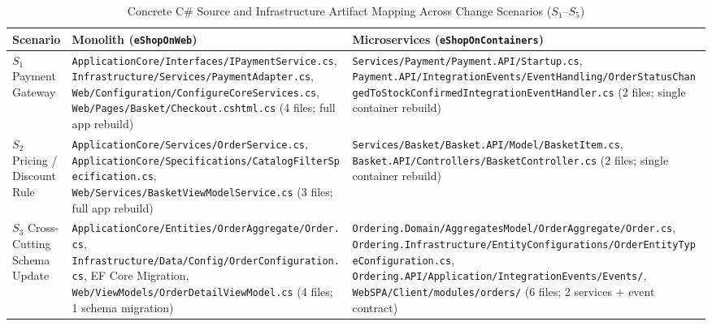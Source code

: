 \begin{table}[htbp]
\centering
\caption{Concrete C\# Source and Infrastructure Artifact Mapping Across Change Scenarios ($S_1$--$S_5$)}
\label{tab:csharp_artifact_map}
\footnotesize
\setlength{\tabcolsep}{4pt}
\renewcommand{\arraystretch}{1.25}
\begin{tabularx}{\linewidth}{>{\raggedright\arraybackslash}p{1.85cm} >{\raggedright\arraybackslash}X >{\raggedright\arraybackslash}X}
\toprule
\textbf{Scenario} & \textbf{Monolith (\texttt{eShopOnWeb})} & \textbf{Microservices (\texttt{eShopOnContainers})} \\
\midrule
$S_1$ Payment Gateway &
\texttt{ApplicationCore/\allowbreak Interfaces/\allowbreak IPaymentService.cs}, \texttt{Infrastructure/\allowbreak Services/\allowbreak PaymentAdapter.cs}, \texttt{Web/\allowbreak Configuration/\allowbreak ConfigureCoreServices.cs}, \texttt{Web/\allowbreak Pages/\allowbreak Basket/\allowbreak Checkout.cshtml.cs} (4 files; full app rebuild) &
\texttt{Services/\allowbreak Payment/\allowbreak Payment.API/\allowbreak Startup.cs}, \texttt{Payment.API/\allowbreak IntegrationEvents/\allowbreak EventHandling/\allowbreak OrderStatusChangedToStockConfirmedIntegrationEventHandler.cs} (2 files; single container rebuild) \\
\addlinespace
$S_2$ Pricing / Discount Rule &
\texttt{ApplicationCore/\allowbreak Services/\allowbreak OrderService.cs}, \texttt{ApplicationCore/\allowbreak Specifications/\allowbreak CatalogFilterSpecification.cs}, \texttt{Web/\allowbreak Services/\allowbreak BasketViewModelService.cs} (3 files; full app rebuild) &
\texttt{Services/\allowbreak Basket/\allowbreak Basket.API/\allowbreak Model/\allowbreak BasketItem.cs}, \texttt{Basket.API/\allowbreak Controllers/\allowbreak BasketController.cs} (2 files; single container rebuild) \\
\addlinespace
$S_3$ Cross-Cutting Schema Update &
\texttt{ApplicationCore/\allowbreak Entities/\allowbreak OrderAggregate/\allowbreak Order.cs}, \texttt{Infrastructure/\allowbreak Data/\allowbreak Config/\allowbreak OrderConfiguration.cs}, EF Core Migration, \texttt{Web/\allowbreak ViewModels/\allowbreak OrderDetailViewModel.cs} (4 files; 1 schema migration) &
\texttt{Ordering.Domain/\allowbreak AggregatesModel/\allowbreak OrderAggregate/\allowbreak Order.cs}, \texttt{Ordering.Infrastructure/\allowbreak EntityConfigurations/\allowbreak OrderEntityTypeConfiguration.cs}, \texttt{Ordering.API/\allowbreak Application/\allowbreak IntegrationEvents/\allowbreak Events/}, \texttt{WebSPA/\allowbreak Client/\allowbreak modules/\allowbreak orders/} (6 files; 2 services + event contract) \\

\end{tabularx}
\end{table}
